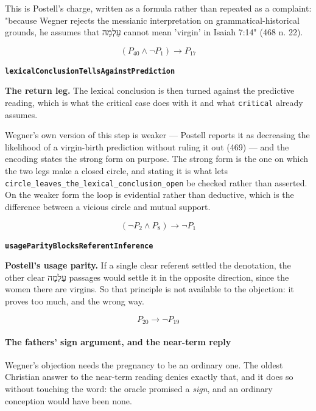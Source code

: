 \documentclass[11pt]{article}
\begin{document}
This is Postell's charge, written as a formula rather than repeated as a complaint: "because Wegner rejects the messianic interpretation on grammatical-historical grounds, he assumes that עַלְמָה cannot mean 'virgin' in Isaiah 7:14" (468 n. 22).

\[(P_{40} \land \lnot P_{1}) \rightarrow P_{17}\]
\par\medskip\noindent\textbf{\texttt{lexical\allowbreak{}Conclusion\allowbreak{}Tells\allowbreak{}Against\allowbreak{}Prediction}}\par\nobreak\noindent
\textbf{The return leg.} The lexical conclusion is then turned against the predictive reading, which is what the critical case does with it and what \texttt{critical} already assumes.

Wegner's own version of this step is weaker — Postell reports it as decreasing the likelihood of a virgin-birth prediction without ruling it out (469) — and the encoding states the strong form on purpose. The strong form is the one on which the two legs make a closed circle, and stating it is what lets \texttt{circle\_\allowbreak{}leaves\_\allowbreak{}the\_\allowbreak{}lexical\_\allowbreak{}conclusion\_\allowbreak{}open} be checked rather than asserted. On the weaker form the loop is evidential rather than deductive, which is the difference between a vicious circle and mutual support.

\[(\lnot P_{2} \land P_{8}) \rightarrow \lnot P_{1}\]
\par\medskip\noindent\textbf{\texttt{usage\allowbreak{}Parity\allowbreak{}Blocks\allowbreak{}Referent\allowbreak{}Inference}}\par\nobreak\noindent
\textbf{Postell's usage parity.} If a single clear referent settled the denotation, the other clear עַלְמָה passages would settle it in the opposite direction, since the women there are virgins. So that principle is not available to the objection: it proves too much, and the wrong way.

\[P_{20} \rightarrow \lnot P_{19}\]
\paragraph*{The fathers' sign argument, and the near-term reply}
\leavevmode\par
Wegner's objection needs the pregnancy to be an ordinary one. The oldest Christian answer to the near-term reading denies exactly that, and it does so without touching the word: the oracle promised a \emph{sign}, and an ordinary conception would have been none.
\end{document}
